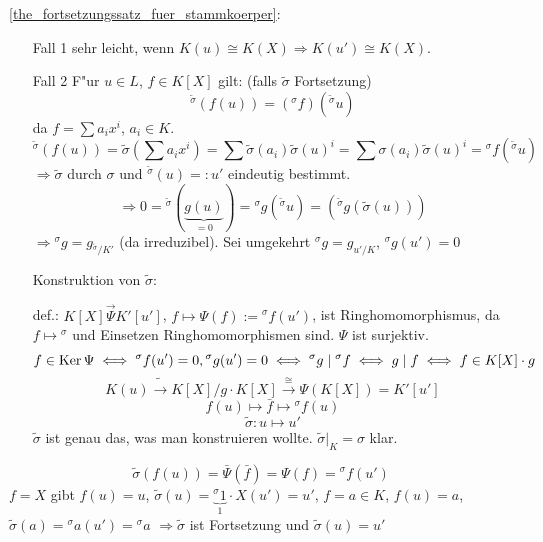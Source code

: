 \proof \ref{the_fortsetzungssatz_fuer_stammkoerper}:{\begin{enumerate}
 \item[Fall 1] sehr leicht, wenn $K(u)\cong K(X)\Rightarrow K(u')\cong K(X)$.
 \item[Fall 2] F"ur $u\in L$, $f\in K[X]$ gilt: (falls $\tilde{\sigma}$ Fortsetzung)
 \[{}^{\tilde{\sigma}}(f(u))=({}^{\sigma}f)({}^{\tilde{\sigma}}u)\]
 da $f=\sum a_ix^i$, $a_i\in K$.
 \[{}^{\tilde{\sigma}}(f(u))=\tilde{\sigma}(\sum a_ix^i)=\sum \tilde{\sigma}(a_i)\tilde{\sigma}(u)^i
 =\sum \sigma(a_i)\tilde{\sigma}(u)^i={}^{\sigma}f({}^{\tilde{\sigma}}u)\]
 $\Rightarrow \tilde{\sigma}$ durch $\sigma$ und ${}^{\tilde{\sigma}}(u)=:u'$ eindeutig bestimmt.
 \[\Rightarrow 0={}^{\tilde{\sigma}}(\underbrace{g(u)}_{=0})={}^{\sigma}g({}^{\tilde{\sigma}}u)
 =({}^{\tilde{\sigma}}g({\tilde{\sigma}}(u)))\]
 $\Rightarrow {}^{\sigma}g=g_{{}^{\tilde{\sigma}}/K'}$ (da irreduzibel).
 Sei umgekehrt ${}^{\sigma}g=g_{u'/K}$, ${}^{\sigma}g(u')=0$
 
 Konstruktion von $\tilde{\sigma}$:
 
 def.: $K[X]\stackrel{\longrightarrow}{\Psi} K'[u']$, $f\mapsto \Psi(f):={}^{\sigma}f(u')$, ist 
 Ringhomomorphismus, da $f\mapsto {}^{\sigma}$ und Einsetzen Ringhomomorphismen sind. $\Psi$ ist surjektiv.
 \[f\in \operatorname{Ker}\Psi\iff {}^{\sigma}f(u')=0, {}^{\sigma}g(u')=0
 \iff {}^{\sigma}g \mid{}^{\sigma}f \iff g\mid f \iff f\in K[X]\cdot g\]
 \[K(u)\tilde{\longrightarrow} K[X]/g\cdot K[X] \stackrel{\cong}{\longrightarrow}\Psi(K[X])=K'[u']\]
 \[f(u)\mapsto \bar{f} \mapsto {}^{\sigma}f(u)\]
 \[\tilde{\sigma}:u \mapsto u'\]
 $\tilde{\sigma}$ ist genau das, was man konstruieren wollte.
 $\tilde{\sigma}|_K=\sigma$ klar. 
 \end{enumerate}
 \[\tilde{\sigma}(f(u))=\bar{\Psi}(\bar{f})=\Psi(f)={}^{\sigma}f(u')\]
 $f=X$ gibt $f(u)=u$, $\tilde{\sigma}(u)=\underbrace{{}^{\sigma}1}_{1} \cdot X(u')=u'$,
 $f=a\in K$, $f(u)=a$, $\tilde{\sigma}(a)={}^{\sigma}a(u')={}^{\sigma}a$
 $\Rightarrow \tilde{\sigma}$ ist Fortsetzung und $\tilde{\sigma}(u)=u'$
 
 
 }
